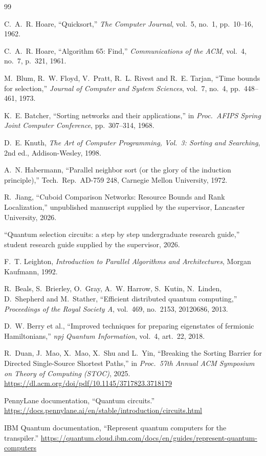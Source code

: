 \documentclass[11pt,a4paper]{article}
\begin{document}
\begin{thebibliography}{99}

 C.~A.~R. Hoare, ``Quicksort,'' \emph{The Computer Journal}, vol.~5, no.~1, pp.~10--16, 1962.

 C.~A.~R. Hoare, ``Algorithm 65: Find,'' \emph{Communications of the ACM}, vol.~4, no.~7, p.~321, 1961.

 M.~Blum, R.~W. Floyd, V.~Pratt, R.~L. Rivest and R.~E. Tarjan, ``Time bounds for selection,'' \emph{Journal of Computer and System Sciences}, vol.~7, no.~4, pp.~448--461, 1973.

 K.~E. Batcher, ``Sorting networks and their applications,'' in \emph{Proc.\ AFIPS Spring Joint Computer Conference}, pp.~307--314, 1968.

 D.~E. Knuth, \emph{The Art of Computer Programming, Vol.~3: Sorting and Searching}, 2nd ed., Addison-Wesley, 1998.

 A.~N. Habermann, ``Parallel neighbor sort (or the glory of the induction principle),'' Tech.\ Rep.\ AD-759 248, Carnegie Mellon University, 1972.

 R.~Jiang, ``Cuboid Comparison Networks: Resource Bounds and Rank Localization,'' unpublished manuscript supplied by the supervisor, Lancaster University, 2026.

 ``Quantum selection circuits: a step by step undergraduate research guide,'' student research guide supplied by the supervisor, 2026.

 F.~T. Leighton, \emph{Introduction to Parallel Algorithms and Architectures}, Morgan Kaufmann, 1992.

 R.~Beals, S.~Brierley, O.~Gray, A.~W. Harrow, S.~Kutin, N.~Linden, D.~Shepherd and M.~Stather, ``Efficient distributed quantum computing,'' \emph{Proceedings of the Royal Society A}, vol.~469, no.~2153, 20120686, 2013.

 D.~W. Berry et al., ``Improved techniques for preparing eigenstates of fermionic Hamiltonians,'' \emph{npj Quantum Information}, vol.~4, art.~22, 2018.

 R.~Duan, J.~Mao, X.~Mao, X.~Shu and L.~Yin, ``Breaking the Sorting Barrier for Directed Single-Source Shortest Paths,'' in \emph{Proc.\ 57th Annual ACM Symposium on Theory of Computing (STOC)}, 2025. \url{https://dl.acm.org/doi/pdf/10.1145/3717823.3718179}

 PennyLane documentation, ``Quantum circuits.'' \url{https://docs.pennylane.ai/en/stable/introduction/circuits.html}

 IBM Quantum documentation, ``Represent quantum computers for the transpiler.'' \url{https://quantum.cloud.ibm.com/docs/en/guides/represent-quantum-computers}

\end{thebibliography}
\end{document}
